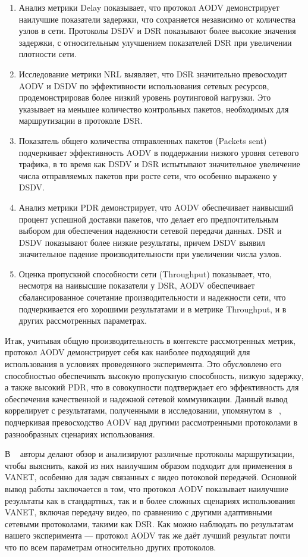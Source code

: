 \begin{enumerate}
    \item Анализ метрики Delay показывает, что протокол AODV демонстрирует наилучшие показатели задержки, что сохраняется независимо от количества узлов в сети. Протоколы DSDV и DSR показывают более высокие значения задержки, с относительным улучшением показателей DSR при увеличении плотности сети.

    \item Исследование метрики NRL выявляет, что DSR значительно превосходит AODV и DSDV по эффективности использования сетевых ресурсов, продемонстрировав более низкий уровень роутинговой нагрузки. Это указывает на меньшее количество контрольных пакетов, необходимых для маршрутизации в протоколе DSR.

    \item Показатель общего количества отправленных пакетов (Packets sent) подчеркивает эффективность AODV в поддержании низкого уровня сетевого трафика, в то время как DSDV и DSR испытывают значительное увеличение числа отправляемых пакетов при росте сети, что особенно выражено у DSDV.

    \item Анализ метрики PDR демонстрирует, что AODV обеспечивает наивысший процент успешной доставки пакетов, что делает его предпочтительным выбором для обеспечения надежности сетевой передачи данных. DSR и DSDV показывают более низкие результаты, причем DSDV выявил значительное падение производительности при увеличении числа узлов.

    \item Оценка пропускной способности сети (Throughput) показывает, что, несмотря на наивысшие показатели у DSR, AODV обеспечивает сбалансированное сочетание производительности и надежности сети, что подчеркивается его хорошими результатами и в метрике Throughput, и в других рассмотренных параметрах.
\end{enumerate}

Итак, учитывая общую производительность в контексте рассмотренных метрик, протокол AODV демонстрирует себя как наиболее подходящий для использования в условиях проведенного эксперимента. Это обусловлено его способностью обеспечивать высокую пропускную способность, низкую задержку, а также высокий PDR, что в совокупности подтверждает его эффективность для обеспечения качественной и надежной сетевой коммуникации. Данный вывод коррелирует с результатами, полученными в исследовании, упомянутом в ~\cite{rizwan2018vanet}, подчеркивая превосходство AODV над другими рассмотренными протоколами в разнообразных сценариях использования.

В ~\cite{rizwan2018vanet} авторы делают обзор и анализируют различные протоколы маршрутизации, чтобы выяснить, какой из них наилучшим образом подходит для применения в VANET, особенно для задач связанных с видео потоковой передачей. Основной вывод работы заключается в том, что протокол AODV показывает наилучшие результаты как в стандартных, так и в более сложных сценариях использования VANET, включая передачу видео, по сравнению с другими адаптивными сетевыми протоколами, такими как DSR. Как можно наблюдать по результатам нашего эксперимента --- протокол AODV так же даёт лучший результат почти что по всем параметрам относительно других протоколов.